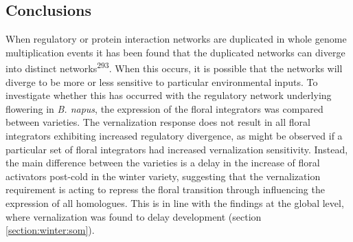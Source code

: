 \documentclass[12pt,]{book}
\begin{document}
\subsection{Conclusions}\label{conclusions-6}

When regulatory or protein interaction networks are duplicated in whole
genome multiplication events it has been found that the duplicated
networks can diverge into distinct networks\textsuperscript{293}. When
this occurs, it is possible that the networks will diverge to be more or
less sensitive to particular environmental inputs. To investigate
whether this has occurred with the regulatory network underlying
flowering in \emph{B. napus}, the expression of the floral integrators
was compared between varieties. The vernalization response does not
result in all floral integrators exhibiting increased regulatory
divergence, as might be observed if a particular set of floral
integrators had increased vernalization sensitivity. Instead, the main
difference between the varieties is a delay in the increase of floral
activators post-cold in the winter variety, suggesting that the
vernalization requirement is acting to repress the floral transition
through influencing the expression of all homologues. This is in line
with the findings at the global level, where vernalization was found to
delay development (section \ref{section:winter:som}).
\end{document}
